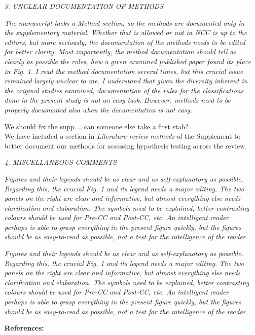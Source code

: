 \documentclass[11pt]{article}
\begin{document}
\emph{3. UNCLEAR DOCUMENTATION OF METHODS}

\emph{The manuscript lacks a Method-section, so the methods are documented only in the supplementary material. Whether that is allowed or not in NCC is up to the editors, but more seriously, the documentation of the methods needs to be edited for better clarity. Most importantly, the method documentation should tell as clearly as possible the rules, how a given examined published paper found its place in Fig. 1. I read the method documentation several times, but this crucial issue remained largely unclear to me. I understand that given the diversity inherent in the original studies examined, documentation of the rules for the classifications done in the present study is not an easy task. However, methods need to be properly documented also when the documentation is not easy.}

We should fix the supp.... can someone else take a first stab? \\

We have included a section in \emph{Literature review methods} of the Supplement to better document our methods for assessing hypothesis testing across the review. 

\emph{4. MISCELLANEOUS COMMENTS}

\emph{Figures and their legends should be as clear and as self-explanatory as possible. Regarding this, the crucial Fig. 1 and its legend needs a major editing. The two panels on the right are clear and informative, but almost everything else needs clarification and elaboration. The symbols need to be explained, better contrasting colours should be used for Pre-CC and Post-CC, etc. An intelligent reader perhaps is able to grasp everything in the present figure quickly, but the figures should be as easy-to-read as possible, not a test for the intelligence of the reader.}

\emph{Figures and their legends should be as clear and as self-explanatory as possible. Regarding this, the crucial Fig. 1 and its legend needs a major editing. The two panels on the right are clear and informative, but almost everything else needs clarification and elaboration. The symbols need to be explained, better contrasting colours should be used for Pre-CC and Post-CC, etc. An intelligent reader perhaps is able to grasp everything in the present figure quickly, but the figures should be as easy-to-read as possible, not a test for the intelligence of the reader.}

\newpage
{\bf References:}

\end{document}
